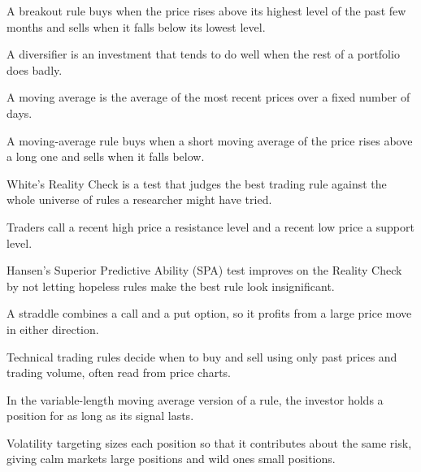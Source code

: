 \begin{keyterms}
\small
\begin{description}[leftmargin=0pt, itemsep=2pt, parsep=0pt, font=\normalfont\bfseries\color{FEMaroon}]
  \item[Breakout rule.] A breakout rule buys when the price rises above its highest level of the past few months and sells when it falls below its lowest level.
  \item[Diversifier.] A diversifier is an investment that tends to do well when the rest of a portfolio does badly.
  \item[Moving average.] A moving average is the average of the most recent prices over a fixed number of days.
  \item[Moving-average rule.] A moving-average rule buys when a short moving average of the price rises above a long one and sells when it falls below.
  \item[Reality Check.] White's Reality Check is a test that judges the best trading rule against the whole universe of rules a researcher might have tried.
  \item[Resistance and support levels.] Traders call a recent high price a resistance level and a recent low price a support level.
  \item[SPA test.] Hansen's Superior Predictive Ability (SPA) test improves on the Reality Check by not letting hopeless rules make the best rule look insignificant.
  \item[Straddle.] A straddle combines a call and a put option, so it profits from a large price move in either direction.
  \item[Technical trading rules.] Technical trading rules decide when to buy and sell using only past prices and trading volume, often read from price charts.
  \item[Variable-length moving average.] In the variable-length moving average version of a rule, the investor holds a position for as long as its signal lasts.
  \item[Volatility targeting.] Volatility targeting sizes each position so that it contributes about the same risk, giving calm markets large positions and wild ones small positions.
\end{description}
\end{keyterms}
